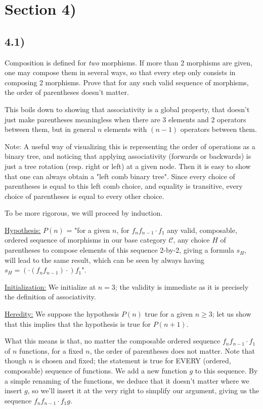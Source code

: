 \documentclass[12pt, letterpaper, twoside]{report}
\begin{document}
\section*{Section 4)}

\subsection*{4.1)}

Composition is defined for \textit{two} morphisms. If more than 2 morphisms are given, one may compose them in several ways, so that every step only consists in composing 2 morphisms. Prove that for any such valid sequence of morphisms, the order of parentheses doesn't matter.

This boils down to showing that associativity is a global property, that doesn't just make parentheses meaningless when there are 3 elements and 2 operators between them, but in general $n$ elements with $(n-1)$ operators between them.

Note: A useful way of visualizing this is representing the order of operations as a binary tree, and noticing that applying associativity (forwards or backwards) is just a tree rotation (resp. right or left) at a given node. Then it is easy to show that one can always obtain a "left comb binary tree". Since every choice of parentheses is equal to this left comb choice, and equality is transitive, every choice of parentheses is equal to every other choice.

To be more rigorous, we will proceed by induction.

\underline{Hypothesis:} $P(n)$ = "for a given $n$, for $f_n f_{n-1} \cdot f_1$ any valid, composable, ordered sequence of morphisms in our base category $\mathcal{C}$, any choice $H$ of parentheses to compose elements of this sequence 2-by-2, giving a formula $s_H$, will lead to the same result, which can be seen by always having $s_H = (\cdot(f_n f_{n-1}) \cdot) f_1$".

\underline{Initialization:} We initialize at $n = 3$; the validity is immediate as it is precisely the definition of associativity.

\underline{Heredity:} We suppose the hypothesis $P(n)$ true for a given $n \geq 3$; let us show that this implies that the hypothesis is true for $P(n+1)$.

What this means is that, no matter the composable ordered sequence $f_n f_{n-1} \cdot f_1$ of $n$ functions, for a fixed $n$, the order of parentheses does not matter. Note that though $n$ is chosen and fixed; the statement is true for EVERY (ordered, composable) sequence of functions. We add a new function $g$ to this sequence. By a simple renaming of the functions, we deduce that it doesn't matter where we insert $g$, so we'll insert it at the very right to simplify our argument, giving us the sequence $f_n f_{n-1} \cdot f_1 g$.
\end{document}
